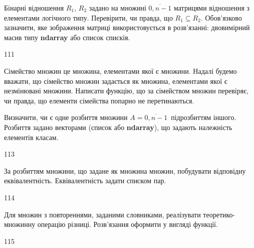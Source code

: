 Бінарні відношення $R_1$, $R_2$ задано на множині $\overline{0,n-1}$ матрицями відношення з елементами логічного типу. Перевірити, чи правда, що  $R_1\subseteq R_2$. Обов'язково зазначити, яке зображення матриці використовується в розв'язанні: двовимірний масив типу \textbf{ndarray} або список списків.
\\\par
111 














Сімейство множин це множина, елементами якої є множини. Надалі будемо вважати, що сімейство множин задається як множина, елементами якої є незмінювані множини. Написати функцію, що за сімейством множин перевіряє, чи правда, що елементи сімейства попарно не перетинаються.
\\\par
{} 














Визначити, чи є одне розбиття множини $A=\overline{0,n-1}$\ підрозбиттям іншого. Розбиття задано векторами (список або  \textbf{ndarray}), що задають належність елементів класам.
\\\par
113 














За розбиттям множини, що задане як множина множин, побудувати відповідну еквівалентність. Еквівалентність задати списком пар.
\\\par
114 














Для множин з повтореннями, заданими словниками, реалізувати теоретико-множинну операцію різниці. Розв’язання оформити у вигляді функції.
\\\par
115 














